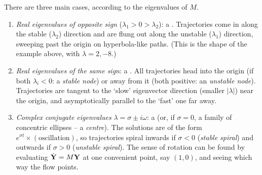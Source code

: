 \documentclass[a4paper]{scrartcl}
\begin{document}
There are three main cases, according to the eigenvalues of $M$.

\begin{enumerate}[label=(\arabic*)]
	\item \emph{Real eigenvalues of opposite sign} ($\lambda_1 > 0 > \lambda_2$): a . Trajectories come in along the stable ($\lambda_2$) direction and are flung out along the unstable ($\lambda_1$) direction, sweeping past the origin on hyperbola-like paths. (This is the shape of the example above, with $\lambda = 2, -8$.)
	\item \emph{Real eigenvalues of the same sign}: a . All trajectories head into the origin (if both $\lambda_i < 0$: a \emph{stable node}) or away from it (both positive: an \emph{unstable node}). Trajectories are tangent to the `slow' eigenvector direction (smaller $|\lambda|$) near the origin, and asymptotically parallel to the `fast' one far away.
	\item \emph{Complex conjugate eigenvalues} $\lambda = \sigma \pm i\omega$: a  (or, if $\sigma = 0$, a family of concentric ellipses -- a \emph{centre}). The solutions are of the form $e^{\sigma t} \times (\text{oscillation})$, so trajectories spiral inwards if $\sigma < 0$ (\emph{stable spiral}) and outwards if $\sigma > 0$ (\emph{unstable spiral}). The sense of rotation can be found by evaluating $\dot{\mathbf{Y}} = M \mathbf{Y}$ at one convenient point, say $(1, 0)$, and seeing which way the flow points.
\end{enumerate}
\end{document}
